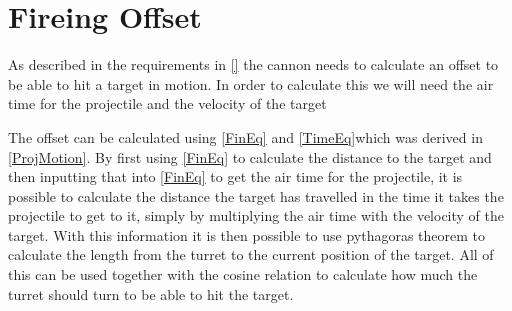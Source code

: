 \section{Fireing Offset}
As described in the requirements in \autoref{} the cannon needs to calculate an
offset to be able to hit a target in motion. In order to calculate this we will
need the air time for the projectile and the velocity of the target\nl


The offset can be calculated using \autoref{FinEq} and \autoref{TimeEq}which was
derived in \autoref{ProjMotion}. By first using \autoref{FinEq} to calculate the
distance to the target and then inputting that into \autoref{FinEq} to get the
air time for the projectile, it is possible to calculate the distance the target
has travelled in the time it takes the projectile to get to it, simply by
multiplying the air time with the velocity of the target. With this information
it is then possible to use pythagoras theorem to calculate the length from the
turret to the current position of the target. All of this can be used together
with the cosine relation to calculate how much the turret should turn to be able
to hit the target.
